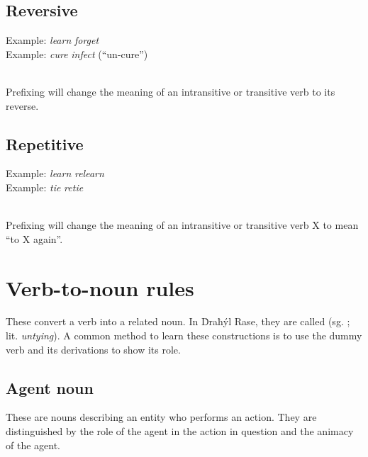 \documentclass{book}
\begin{document}
\subsection{Reversive}

Example:  \emph{learn} \ra{}  \emph{forget} \\
Example:  \emph{cure} \ra{}  \emph{infect} (``un-cure'') \\
~

Prefixing  will change the meaning of an intransitive or transitive verb to its reverse.

\subsection{Repetitive}

Example:  \emph{learn} \ra{}  \emph{relearn} \\
Example:  \emph{tie} \ra{}  \emph{retie} \\
~

Prefixing  will change the meaning of an intransitive or transitive verb X to mean ``to X again''.

\section{Verb-to-noun rules}

These convert a verb into a related noun. In Ḋraħýl Rase, they are called  (sg. ; lit. \emph{untying}). A common method to learn these constructions is to use the dummy verb  and its derivations to show its role.

\subsection{Agent noun}

These are nouns describing an entity who performs an action. They are distinguished by the role of the agent in the action in question and the animacy of the agent.
\end{document}
